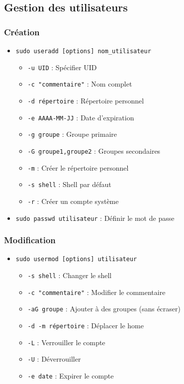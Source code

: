 \documentclass[12pt,a4paper]{article}
\begin{document}
\subsection{Gestion des utilisateurs}

\subsubsection{Création}
\begin{itemize}
    \item \texttt{sudo useradd [options] nom\_utilisateur}
    \begin{itemize}
        \item \texttt{-u UID} : Spécifier UID
        \item \texttt{-c "commentaire"} : Nom complet
        \item \texttt{-d répertoire} : Répertoire personnel
        \item \texttt{-e AAAA-MM-JJ} : Date d'expiration
        \item \texttt{-g groupe} : Groupe primaire
        \item \texttt{-G groupe1,groupe2} : Groupes secondaires
        \item \texttt{-m} : Créer le répertoire personnel
        \item \texttt{-s shell} : Shell par défaut
        \item \texttt{-r} : Créer un compte système
    \end{itemize}
    \item \texttt{sudo passwd utilisateur} : Définir le mot de passe
\end{itemize}

\subsubsection{Modification}
\begin{itemize}
    \item \texttt{sudo usermod [options] utilisateur}
    \begin{itemize}
        \item \texttt{-s shell} : Changer le shell
        \item \texttt{-c "commentaire"} : Modifier le commentaire
        \item \texttt{-aG groupe} : Ajouter à des groupes (sans écraser)
        \item \texttt{-d -m répertoire} : Déplacer le home
        \item \texttt{-L} : Verrouiller le compte
        \item \texttt{-U} : Déverrouiller
        \item \texttt{-e date} : Expirer le compte
    \end{itemize}
\end{itemize}
\end{document}
